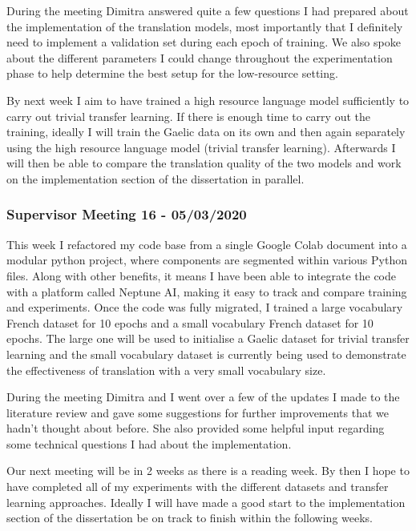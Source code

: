 During the meeting Dimitra answered quite a few questions I had prepared about the implementation of the translation models, most importantly that I definitely need to implement a validation set during each epoch of training. We also spoke about the different parameters I could change throughout the experimentation phase to help determine the best setup for the low-resource setting.

By next week I aim to have trained a high resource language model sufficiently to carry out trivial transfer learning. If there is enough time to carry out the training, ideally I will train the Gaelic data on its own and then again separately using the high resource language model (trivial transfer learning). Afterwards I will then be able to compare the translation quality of the two models and work on the implementation section of the dissertation in parallel.


\subsubsection{Supervisor Meeting 16 - 05/03/2020}
This week I refactored my code base from a single Google Colab document into a modular python project, where components are segmented within various Python files. Along with other benefits, it means I have been able to integrate the code with a platform called Neptune AI, making it easy to track and compare training and experiments. Once the code was fully migrated, I trained a large vocabulary French dataset for 10 epochs and a small vocabulary French dataset for 10 epochs. The large one will be used to initialise a Gaelic dataset for trivial transfer learning and the small vocabulary dataset is currently being used to demonstrate the effectiveness of translation with a very small vocabulary size.

During the meeting Dimitra and I went over a few of the updates I made to the literature review and gave some suggestions for further improvements that we hadn't thought about before. She also provided some helpful input regarding some technical questions I had about the implementation.

Our next meeting will be in 2 weeks as there is a reading week. By then I hope to have completed all of my experiments with the different datasets and transfer learning approaches. Ideally I will have made a good start to the implementation section of the dissertation be on track to finish within the following weeks.